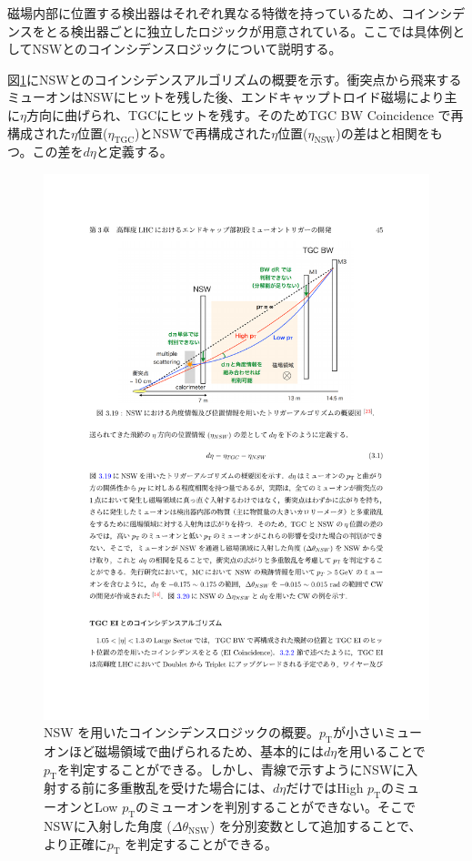 磁場内部に位置する検出器はそれぞれ異なる特徴を持っているため、コインシデンスをとる検出器ごとに独立したロジックが用意されている。ここでは具体例としてNSWとのコインシデンスロジックについて説明する。

図\ref{Concept_NSW}にNSWとのコインシデンスアルゴリズムの概要を示す。衝突点から飛来するミューオンはNSWにヒットを残した後、エンドキャップトロイド磁場により主に$\eta$方向に曲げられ、TGCにヒットを残す。そのためTGC BW Coincidence で再構成された$\eta$位置($\eta_{\mathrm{TGC}}$)とNSWで再構成された$\eta$位置($\eta_{\mathrm{NSW}}$)の差は\pt と相関をもつ。この差を$d\eta$と定義する。

\begin{figure} 
\centering
\includegraphics[width=16cm]{fig/SL/Concept_NSW.pdf}
\caption[NSW を用いたコインシデンスロジックの概要]{NSW を用いたコインシデンスロジックの概要\cite{mt_akatsuka}。$p_\mathrm{T}$が小さいミューオンほど磁場領域で曲げられるため、基本的には$d\eta$を用いることで$p_\mathrm{T}$を判定することができる。しかし、青線で示すようにNSWに入射する前に多重散乱を受けた場合には、$d\eta$だけではHigh $p_\mathrm{T}$のミューオンとLow $p_\mathrm{T}$のミューオンを判別することができない。そこでNSWに入射した角度 ($\Delta\theta_{\mathrm{NSW}}$) を分別変数として追加することで、より正確に$p_\mathrm{T}$ を判定することができる。}
\label{Concept_NSW}
\end{figure}

